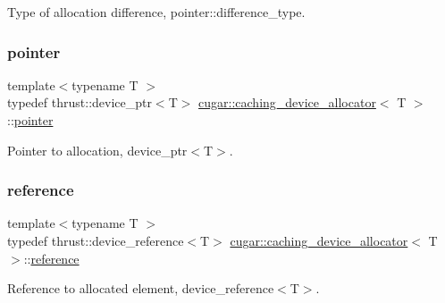 Type of allocation difference, {\ttfamily pointer\+::difference\+\_\+type}. \mbox{\label{structcugar_1_1caching__device__allocator_a442ab01357a3851bb0e9f17c5e49fce3}} 
\subsubsection{\texorpdfstring{pointer}{pointer}}
{\footnotesize\ttfamily template$<$typename T $>$ \\
typedef thrust\+::device\+\_\+ptr$<$T$>$ \hyperlink{structcugar_1_1caching__device__allocator}{cugar\+::caching\+\_\+device\+\_\+allocator}$<$ T $>$\+::\hyperlink{structcugar_1_1caching__device__allocator_a442ab01357a3851bb0e9f17c5e49fce3}{pointer}}

Pointer to allocation, {\ttfamily device\+\_\+ptr$<$\+T$>$}. \mbox{\label{structcugar_1_1caching__device__allocator_a13eca6cad4c022bd791efb73d64adb8a}} 
\subsubsection{\texorpdfstring{reference}{reference}}
{\footnotesize\ttfamily template$<$typename T $>$ \\
typedef thrust\+::device\+\_\+reference$<$T$>$ \hyperlink{structcugar_1_1caching__device__allocator}{cugar\+::caching\+\_\+device\+\_\+allocator}$<$ T $>$\+::\hyperlink{structcugar_1_1caching__device__allocator_a13eca6cad4c022bd791efb73d64adb8a}{reference}}

Reference to allocated element, {\ttfamily device\+\_\+reference$<$\+T$>$}. \mbox{\label{structcugar_1_1caching__device__allocator_a6ac404077fed53edacca4e62b15fdbe9}} 
